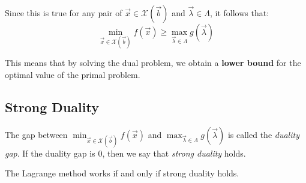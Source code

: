 \documentclass[../main.tex]{subfiles}
\begin{document}
Since this is true for any pair of $\vec{x} \in \mathcal{X}(\vec{b})$ and $\vec{\lambda} \in \Lambda$, it follows that:
\begin{equation}
  \min_{\vec{x} \in \mathcal{X}(\vec{b})} f(\vec{x}) \geq \max_{\vec{\lambda} \in \Lambda} g(\vec{\lambda}) \label{dualityIneq}
\end{equation}
\begin{remark}
  This means that by solving the dual problem, we obtain a \textbf{lower bound} for the optimal value of the primal problem.
\end{remark}
\subsection{Strong Duality}
\begin{definition}
  The gap between $\min_{\vec{x} \in \mathcal{X}(\vec{b})} f(\vec{x})$ and $\max_{\vec{\lambda} \in \Lambda} g(\vec{\lambda})$ is called the \textit{duality gap}.
  If the duality gap is 0, then we say that \textit{strong duality} holds.
\end{definition}
\begin{theorem}
  The Lagrange method works if and only if strong duality holds. \label{strongDualityThm}
\end{theorem}
\end{document}
